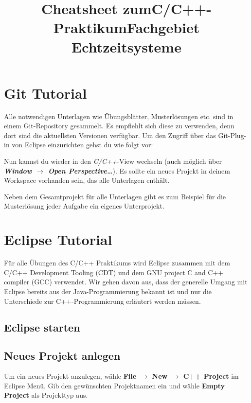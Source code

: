 \documentclass[
  accentcolor=tud1c,	%
  colorbacktitle,		%
  inverttitle,			%
  german,
  twoside
]{tudreport}
\title{Cheatsheet zum\linebreak[1]C/C++-Praktikum\linebreak[1] Fachgebiet Echtzeitsysteme}
\begin{document}
\maketitle

%
%

\chapter{Git Tutorial}
Alle notwendigen Unterlagen wie Übungsblätter, Musterlösungen etc. sind in einem Git-Repository gesammelt. Es empfiehlt sich diese zu verwenden, denn dort sind die aktuellsten Versionen verfügbar. 
Um den Zugriff über das Git-Plug-in von Eclipse einzurichten gehst du wie folgt vor:


Nun kannst du wieder in den \emph{C/C++}-View wechseln (auch möglich über \textbf{\emph{Window $\rightarrow$ Open Perspective\dots}}). Es sollte ein neues Projekt in deinem Workspace vorhanden sein, das alle Unterlagen enthält.

Neben dem Gesamtprojekt für alle Unterlagen gibt es zum Beispiel für die Musterlösung jeder Aufgabe ein eigenes Unterprojekt.

\chapter{Eclipse Tutorial}
Für alle Übungen des C/C++ Praktikums wird Eclipse zusammen mit dem C/C++ Development Tooling (CDT) und dem  GNU project C and C++ compiler (GCC) verwendet.
Wir gehen davon aus, dass der generelle Umgang mit Eclipse bereits aus der Java-Programmierung bekannt ist und nur die Unterschiede zur C++-Programmierung erläutert werden müssen.

\section{Eclipse starten}

\section{Neues Projekt anlegen}
Um ein neues Projekt anzulegen, wähle \textbf{File $\rightarrow$ New $\rightarrow$ C++ Project} im Eclipse Menü.
Gib den gewünschten Projektnamen ein und wähle \textbf{Empty Project} als Projekttyp aus.
\end{document}
